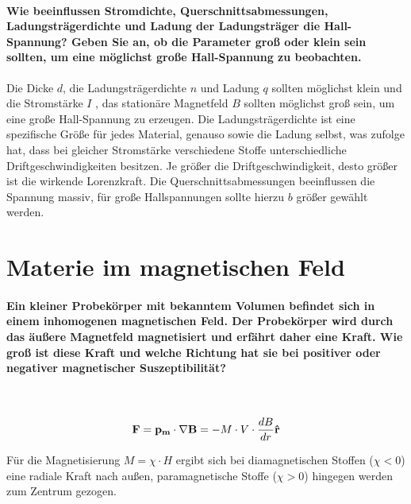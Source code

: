 \documentclass[a4paper, 11pt, ngerman, parskip=half-]{scrartcl}
\begin{document}
\paragraph{Wie beeinflussen Stromdichte, Querschnittsabmessungen, Ladungsträgerdichte und Ladung
    der Ladungsträger die Hall-Spannung? Geben Sie an, ob die Parameter groß oder klein sein sollten, um
    eine möglichst große Hall-Spannung zu beobachten.}
Die Dicke $d$, die Ladungsträgerdichte $n$ und Ladung $q$ sollten möglichst klein und die Stromstärke $I$ , das stationäre Magnetfeld $B$
sollten möglichst groß sein, um eine große Hall-Spannung zu erzeugen. Die Ladungsträgerdichte ist eine spezifische Größe für jedes Material, genauso sowie die Ladung selbst, was zufolge hat, dass
bei gleicher Stromstärke verschiedene Stoffe unterschiedliche Driftgeschwindigkeiten besitzen. Je größer die Driftgeschwindigkeit, desto größer ist die wirkende Lorenzkraft.
Die Querschnittsabmessungen beeinflussen die Spannung massiv, für große Hallspannungen sollte hierzu $b$ größer gewählt werden.

\newpage

\section{Materie im magnetischen Feld}

\paragraph{Ein kleiner Probekörper mit bekanntem Volumen befindet sich in einem inhomogenen
    magnetischen Feld. Der Probekörper wird durch das äußere Magnetfeld magnetisiert und erfährt daher
    eine Kraft. Wie groß ist diese Kraft und welche Richtung hat sie bei positiver oder negativer
    magnetischer Suszeptibilität?} ~

\begin{equation}
    \bold{F} = \bold{p_m} \cdot \nabla \bold{B} = - M \cdot V \cdot \frac{dB}{dr} \bold{\hat{r}}
\end{equation}

Für die Magnetisierung $M = \chi \cdot H$ ergibt sich bei diamagnetischen Stoffen ($\chi < 0$) eine
radiale Kraft nach außen, paramagnetische Stoffe ($\chi > 0$) hingegen werden zum Zentrum gezogen.
\end{document}
